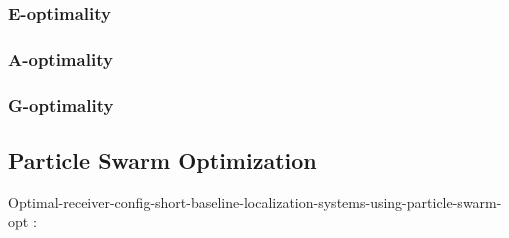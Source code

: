 \subsubsection{E-optimality}

\subsubsection{A-optimality}

\subsubsection{G-optimality}


\subsection{Particle Swarm Optimization}


Optimal-receiver-config-short-baseline-localization-systems-using-particle-swarm-opt : \cite{particle-swarm-opt}